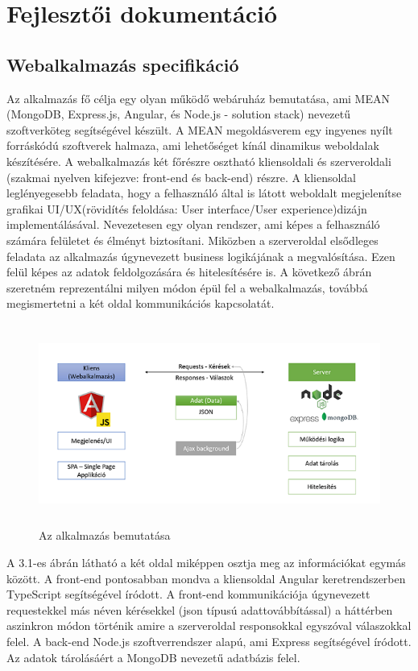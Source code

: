 \chapter{Fejlesztői dokumentáció} %
\label{ch:impl}

\section{Webalkalmazás specifikáció}
Az alkalmazás fő célja egy olyan működő webáruház bemutatása, ami MEAN (MongoDB, Express.js, Angular, és Node.js - solution stack) nevezetű szoftverköteg segítségével készült. A MEAN  megoldásverem egy ingyenes nyílt forráskódú szoftverek halmaza, ami lehetőséget kínál dinamikus weboldalak készítésére. A webalkalmazás két főrészre osztható kliensoldali és szerveroldali (szakmai nyelven kifejezve: front-end és back-end) részre. A kliensoldal leglényegesebb feladata, hogy a felhasználó által is látott weboldalt megjelenítse grafikai UI/UX(rövidítés feloldása: User interface/User experience)dizájn implementálásával. Nevezetesen egy olyan rendszer, ami képes a felhasználó számára felületet és élményt biztosítani. Miközben a szerveroldal elsődleges feladata az alkalmazás úgynevezett business logikájának a megvalósítása. Ezen felül képes az adatok feldolgozására és hitelesítésére is. A következő ábrán szeretném reprezentálni milyen módon épül fel a webalkalmazás, továbbá megismertetni a két oldal kommunikációs kapcsolatát.

\begin{figure}[H]
	\centering
	\includegraphics[width=1.0\textwidth,height=250px]{images/alkalmazas_bemutatasa.png}
	\caption{Az alkalmazás bemutatása}
	\label{fig.picture-1}
\end{figure}

A 3.1-es ábrán látható a két oldal miképpen osztja meg az információkat egymás között. A front-end pontosabban mondva a kliensoldal Angular keretrendszerben TypeScript segítségével íródott. A front-end kommunikációja úgynevezett requestekkel más néven kérésekkel (json típusú adattovábbítással) a háttérben aszinkron módon történik amire a szerveroldal responsokkal egyszóval válaszokkal felel. A back-end Node.js szoftverrendszer alapú, ami Express segítségével íródott. Az adatok tárolásáért a MongoDB nevezetű adatbázis felel.

